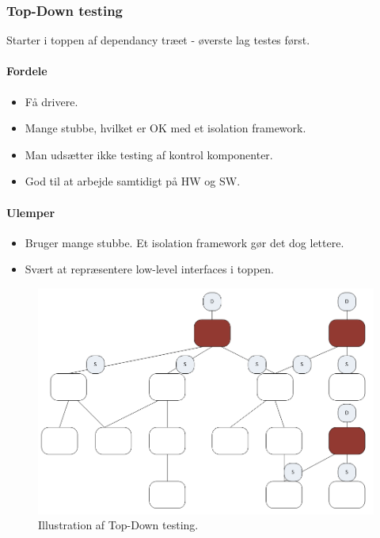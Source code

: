 
\subsubsection{Top-Down testing}
Starter i toppen af dependancy træet - øverste lag testes først.

\paragraph{Fordele}

\begin{itemize}
	\item Få drivere.
	\item Mange stubbe, hvilket er OK med et isolation framework.
	\item Man udsætter ikke testing af kontrol komponenter.
	\item God til at arbejde samtidigt på HW og SW.
\end{itemize}

\paragraph{Ulemper}

\begin{itemize}
	\item Bruger mange stubbe. Et isolation framework gør det dog lettere.
	\item Svært at repræsentere low-level interfaces i toppen. 
\end{itemize}

\begin{figure}[H]
	\centering
	\includegraphics[width=0.5\linewidth]{figs/topDown.PNG}
	\caption{Illustration af Top-Down testing.}
	\label{fig:topDown}
\end{figure}


